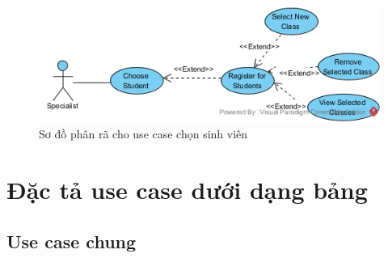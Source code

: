 \documentclass[12pt]{book}
\begin{document}
  \FloatBarrier
  \begin{figure}[ht]
    \centering
    \includegraphics[scale=0.6]{../pictures/projectdiagrams/Choose-Student-uc-destructing.jpg}
    \caption{Sơ đồ phân rã cho use case chọn sinh viên}
  \end{figure}
  \FloatBarrier

  \newpage
  \section{Đặc tả use case dưới dạng bảng}

  \subsection{Use case chung}
\end{document}
